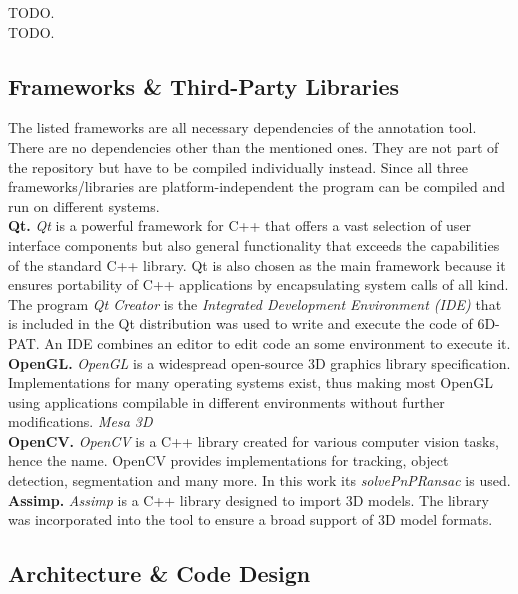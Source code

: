 TODO. \\

TODO. \\

\subsection{Frameworks \& Third-Party Libraries}

The listed frameworks are all necessary dependencies of the annotation tool. There are no dependencies other than the mentioned ones. They are not part of the repository but have to be compiled individually instead. Since all three frameworks/libraries are platform-independent the program can be compiled and run on different systems. \\

\noindent\textbf{Qt.} \textit{Qt} \cite{qt} is a powerful framework for C++ that offers a vast selection of user interface components but also general functionality that exceeds the capabilities of the standard C++ library. Qt is also chosen as the main framework because it ensures portability of C++ applications by encapsulating system calls of all kind. The program \textit{Qt Creator} is the \textit{Integrated Development Environment (IDE)} that is included in the Qt distribution was used to write and execute the code of 6D-PAT. An IDE combines an editor to edit code an some environment to execute it. \\

\noindent\textbf{OpenGL.} \textit{OpenGL} \cite{opengl} is a widespread open-source 3D graphics library specification. Implementations for many operating systems exist, thus making most OpenGL using applications compilable in different environments without further modifications. \textit{Mesa 3D} \\

\noindent\textbf{OpenCV.} \textit{OpenCV} \cite{opencv} is a C++ library created for various computer vision tasks, hence the name. OpenCV provides implementations for tracking, object detection, segmentation and many more. In this work its \textit{solvePnPRansac} is used. \\

\noindent\textbf{Assimp.} \textit{Assimp} \cite{assimp} is a C++ library designed to import 3D models. The library was incorporated into the tool to ensure a broad support of 3D model formats.

\subsection{Architecture \& Code Design}

